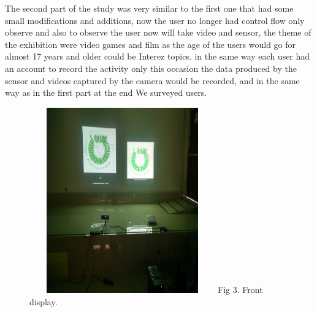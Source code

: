 \documentclass[journal]{IEEEtran}
\begin{document}

The second part of the study was very similar to the first one that had some small modifications and additions, now the user no longer had control flow only observe and also to observe the user now will take video and sensor, the theme of the exhibition were video games and film as the age of the users would go for almost 17 years and older could be Interez topics. in the same way each user had an account to record the activity only this occasion the data produced by the sensor and videos captured by the camera would be recorded, and in the same way as in the first part at the end We surveyed users.
     
\begin{figure}[ht]
	\centering
	\includegraphics[width=80mm,height=80mm]{frenteexhi.PNG}
	\label{fig:Figure 3}
	Fig 3. Front display.
\end{figure}


\end{document}
